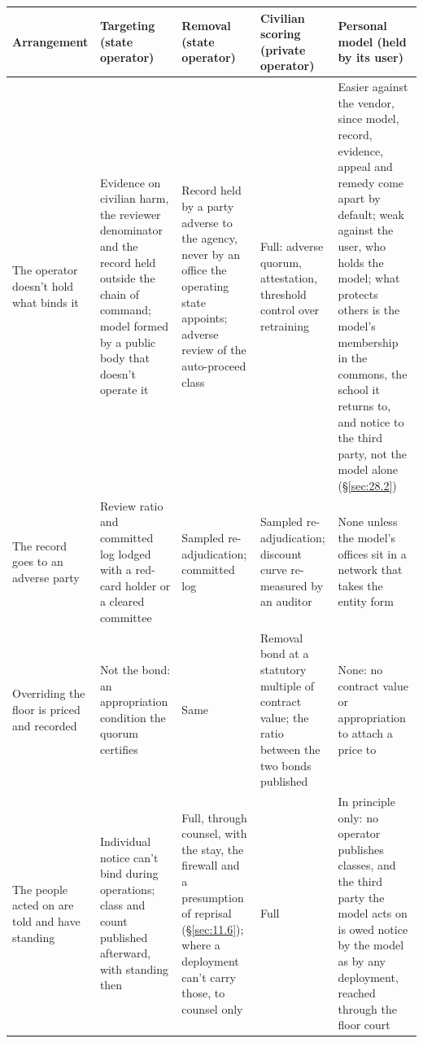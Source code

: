 
\begingroup\small\renewcommand{\arraystretch}{1.12}
\begin{longtable}{@{}>{\raggedright\arraybackslash}p{}>{\raggedright\arraybackslash}p{}>{\raggedright\arraybackslash}p{}>{\raggedright\arraybackslash}p{}>{\raggedright\arraybackslash}p{}@{}}
\hline
\textbf{Arrangement} & \textbf{Targeting (state operator)} & \textbf{Removal (state operator)} & \textbf{Civilian scoring (private operator)} & \textbf{Personal model (held by its user)} \\
\hline
\endhead
The operator doesn't hold what binds it & Evidence on civilian harm, the reviewer denominator and the record held outside the chain of command; model formed by a public body that doesn't operate it & Record held by a party adverse to the agency, never by an office the operating state appoints; adverse review of the auto-proceed class & Full: adverse quorum, attestation, threshold control over retraining & Easier against the vendor, since model, record, evidence, appeal and remedy come apart by default; weak against the user, who holds the model; what protects others is the model's membership in the commons, the school it returns to, and notice to the third party, not the model alone (\S\ref{sec:28.2}) \\ \hline
The record goes to an adverse party & Review ratio and committed log lodged with a red-card holder or a cleared committee & Sampled re-adjudication; committed log & Sampled re-adjudication; discount curve re-measured by an auditor & None unless the model's offices sit in a network that takes the entity form \\ \hline
Overriding the floor is priced and recorded & Not the bond: an appropriation condition the quorum certifies & Same & Removal bond at a statutory multiple of contract value; the ratio between the two bonds published & None: no contract value or appropriation to attach a price to \\ \hline
The people acted on are told and have standing & Individual notice can't bind during operations; class and count published afterward, with standing then & Full, through counsel, with the stay, the firewall and a presumption of reprisal (\S\ref{sec:11.6}); where a deployment can't carry those, to counsel only & Full & In principle only: no operator publishes classes, and the third party the model acts on is owed notice by the model as by any deployment, reached through the floor court \\ \hline

\end{longtable}
